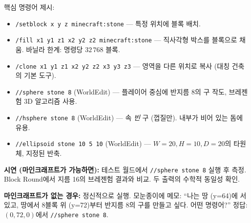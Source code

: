 \documentclass[12pt,a4paper]{scrartcl}
\newcommand{\cmd}[1]{\textcolor{earth}{\texttt{\small #1}}}
\newcommand{\tempo}[1]{\textnormal{\footnotesize\color{bg!90!white}\textsf{#1}}}
\begin{document}
\begin{hwaldong}[4.2 --- 마인크래프트 명령어 \quad\tempo{15분}]\label{at:42}
핵심 명령어 제시:

\begin{itemize}[leftmargin=1.4em,itemsep=0.25em,topsep=0.3em]
  \item \cmd{/setblock x y z minecraft:stone} --- 특정 위치에 블록 배치.
  \item \cmd{/fill x1 y1 z1 x2 y2 z2 minecraft:stone} --- 직사각형 박스를 블록으로 채움. 바닐라 한계: 명령당 $32\,768$ 블록.
  \item \cmd{/clone x1 y1 z1 x2 y2 z2 x3 y3 z3} --- 영역을 다른 위치로 복사 (대칭 건축의 기본 도구).
  \item \cmd{//sphere stone 8} (WorldEdit) --- 플레이어 중심에 반지름 8의 구 작도, 브레젠험 3D 알고리즘 사용.
  \item \cmd{//hsphere stone 8} (WorldEdit) --- 속 \emph{빈} 구 (껍질만). 내부가 비어 있는 돔에 유용.
  \item \cmd{//ellipsoid stone 10 5 10} (WorldEdit) --- $W = 20, H = 10, D = 20$의 타원체, 지정된 반축.
\end{itemize}

\textbf{시연 (마인크래프트가 가능하면):} 테스트 월드에서 \cmd{//sphere stone 8} 실행 후 측정. Block Round에서 지름 16의 브레젠험 결과와 비교. 두 출력의 수학적 동일성 확인.

\textbf{마인크래프트가 없는 경우:} 정신적으로 실행. 모눈종이에 메모: \enquote{나는 땅 (y=64)에 서 있고, 땅에서 8블록 위 (y=72)부터 반지름 8의 구를 만들고 싶다. 어떤 명령어?} 정답: $(0, 72, 0)$에서 \cmd{//sphere stone 8}.
\end{hwaldong}
\end{document}
